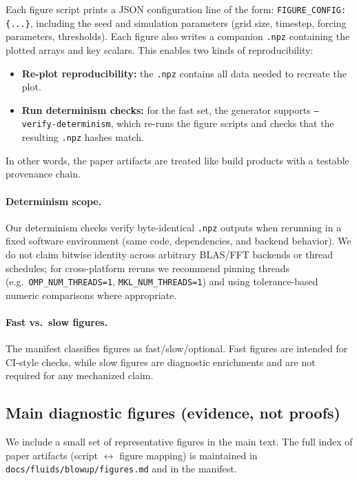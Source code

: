 \documentclass[11pt]{article}
\begin{document}
Each figure script prints a JSON configuration line of the form:
\texttt{FIGURE\_CONFIG: \{...\}},
including the seed and simulation parameters (grid size, timestep, forcing parameters, thresholds).
Each figure also writes a companion \texttt{.npz} containing the plotted arrays and key scalars.
This enables two kinds of reproducibility:
\begin{itemize}
\item \textbf{Re-plot reproducibility:} the \texttt{.npz} contains all data needed to recreate the plot.
\item \textbf{Run determinism checks:} for the fast set, the generator supports
\texttt{--verify-determinism}, which re-runs the figure scripts and checks that the resulting
\texttt{.npz} hashes match.
\end{itemize}
In other words, the paper artifacts are treated like build products with a testable provenance chain.

\paragraph{Determinism scope.}
Our determinism checks verify byte-identical \texttt{.npz} outputs when rerunning in a fixed
software environment (same code, dependencies, and backend behavior). We do not claim bitwise
identity across arbitrary BLAS/FFT backends or thread schedules; for cross-platform reruns we
recommend pinning threads (e.g.\ \texttt{OMP\_NUM\_THREADS=1}, \texttt{MKL\_NUM\_THREADS=1})
and using tolerance-based numeric comparisons where appropriate.

\paragraph{Fast vs.\ slow figures.}
The manifest classifies figures as fast/slow/optional. Fast figures are intended for CI-style
checks, while slow figures are diagnostic enrichments and are not required for any mechanized claim.

\subsection{Main diagnostic figures (evidence, not proofs)}

We include a small set of representative figures in the main text.
The full index of paper artifacts (script $\leftrightarrow$ figure mapping) is maintained in
\texttt{docs/fluids/blowup/figures.md} and in the manifest.
\end{document}
